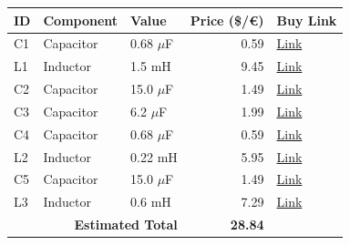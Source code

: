 \begin{table}[H]
    \centering
    \renewcommand{\arraystretch}{1.5}
    \begin{tabular}{@{}lllrl@{}}
        \toprule
        \textbf{ID} & \textbf{Component} & \textbf{Value} & \textbf{Price (\$/€)} & \textbf{Buy Link} \\
        \midrule
        C1 & Capacitor & 0.68 $\mu$F & 0.59 & \href{https://www.parts-express.com/Dayton-Audio-DMPC-0.68-0.68uF-250V-Polypropylene-Capacitor-027-408}{Link} \\
        L1 & Inductor & 1.5 mH & 9.45 & \href{https://www.soundimports.eu/en/jantzen-audio-000-2171.html}{Link} \\
        C2 & Capacitor & 15.0 $\mu$F & 1.49 & \href{https://www.soundimports.eu/en/jantzen-audio-001-6141.html}{Link} \\
        C3 & Capacitor & 6.2 $\mu$F & 1.99 & \href{https://www.parts-express.com/Dayton-Audio-PMPC-6.2-6.2uF-250V-Precision-Audio-Capacitor-027-236}{Link} \\
        C4 & Capacitor & 0.68 $\mu$F & 0.59 & \href{https://www.parts-express.com/Dayton-Audio-DMPC-0.68-0.68uF-250V-Polypropylene-Capacitor-027-408}{Link} \\
        L2 & Inductor & 0.22 mH & 5.95 & \href{https://www.soundimports.eu/en/dayton-audio-lw18-22.html}{Link} \\
        C5 & Capacitor & 15.0 $\mu$F & 1.49 & \href{https://www.soundimports.eu/en/jantzen-audio-001-6141.html}{Link} \\
        L3 & Inductor & 0.6 mH & 7.29 & \href{https://www.parts-express.com/Jantzen-1951-0.60mH-18-AWG-Air-Core-Inductor-255-234}{Link} \\
        \midrule
        \multicolumn{3}{r}{\textbf{Estimated Total}} & \textbf{28.84} & \\
        \bottomrule
    \end{tabular}
\end{table}
